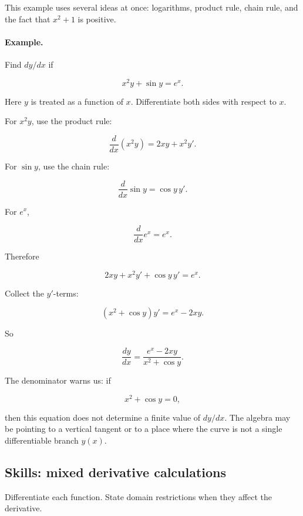 This example uses several ideas at once: logarithms, product rule, chain rule, and the fact that \(x^2+1\) is positive.

\paragraph{Example.}
Find \(dy/dx\) if

\[
x^2y+\sin y=e^x.
\]

Here \(y\) is treated as a function of \(x\).  Differentiate both sides with respect to \(x\).

For \(x^2y\), use the product rule:

\[
\frac{d}{dx}(x^2y)=2xy+x^2y'.
\]

For \(\sin y\), use the chain rule:

\[
\frac{d}{dx}\sin y=\cos y\,y'.
\]

For \(e^x\),

\[
\frac{d}{dx}e^x=e^x.
\]

Therefore

\[
2xy+x^2y'+\cos y\,y'=e^x.
\]

Collect the \(y'\)-terms:

\[
(x^2+\cos y)y'=e^x-2xy.
\]

So

\[
\boxed{
\frac{dy}{dx}
=
\frac{e^x-2xy}{x^2+\cos y}.
}
\]

The denominator warns us: if

\[
x^2+\cos y=0,
\]

then this equation does not determine a finite value of \(dy/dx\).  The algebra may be pointing to a vertical tangent or to a place where the curve is not a single differentiable branch \(y(x)\).

\subsection{Skills: mixed derivative calculations}
\label{subsec:mixed-derivative-calculations}

Differentiate each function.  State domain restrictions when they affect the derivative.

